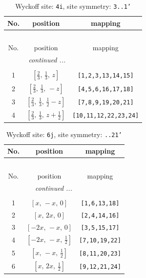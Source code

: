 \documentclass[fleqn,8pt]{jsarticle}
\begin{document}
\renewcommand{\arraystretch}{1.2}
\begin{longtable}{ccc}
\caption{Wyckoff site: {\tt 4i}, site symmetry: {\tt 3..1'}}
 \\
 \hline \hline
No. & position & mapping \\ \hline \endfirsthead

\multicolumn{2}{l}{\tablename\ \thetable{}} \\
 \hline \hline
No. & position & mapping \\ \hline \endhead

 \hline \hline
\multicolumn{2}{r}{\footnotesize\it continued ...} \\ \endfoot

 \hline \hline
\multicolumn{2}{r}{} \\ \endlastfoot

1 & $\left[ \frac{2}{3},\, \frac{1}{3},\, z \right]$ & {\tt [1,2,3,13,14,15]} \\ \hline
2 & $\left[ \frac{2}{3},\, \frac{1}{3},\, - z \right]$ & {\tt [4,5,6,16,17,18]} \\ \hline
3 & $\left[ \frac{2}{3},\, \frac{1}{3},\, \frac{1}{2} - z \right]$ & {\tt [7,8,9,19,20,21]} \\ \hline
4 & $\left[ \frac{2}{3},\, \frac{1}{3},\, z + \frac{1}{2} \right]$ & {\tt [10,11,12,22,23,24]} \\
\end{longtable}
\renewcommand{\arraystretch}{1.2}
\begin{longtable}{ccc}
\caption{Wyckoff site: {\tt 6j}, site symmetry: {\tt ..21'}}
 \\
 \hline \hline
No. & position & mapping \\ \hline \endfirsthead

\multicolumn{2}{l}{\tablename\ \thetable{}} \\
 \hline \hline
No. & position & mapping \\ \hline \endhead

 \hline \hline
\multicolumn{2}{r}{\footnotesize\it continued ...} \\ \endfoot

 \hline \hline
\multicolumn{2}{r}{} \\ \endlastfoot

1 & $\left[ x,\, - x,\, 0 \right]$ & {\tt [1,6,13,18]} \\ \hline
2 & $\left[ x,\, 2 x,\, 0 \right]$ & {\tt [2,4,14,16]} \\ \hline
3 & $\left[ - 2 x,\, - x,\, 0 \right]$ & {\tt [3,5,15,17]} \\ \hline
4 & $\left[ - 2 x,\, - x,\, \frac{1}{2} \right]$ & {\tt [7,10,19,22]} \\ \hline
5 & $\left[ x,\, - x,\, \frac{1}{2} \right]$ & {\tt [8,11,20,23]} \\ \hline
6 & $\left[ x,\, 2 x,\, \frac{1}{2} \right]$ & {\tt [9,12,21,24]} \\
\end{longtable}
\end{document}
